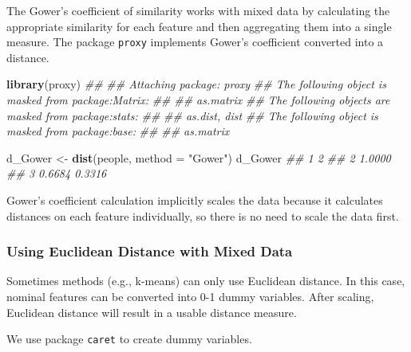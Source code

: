 \documentclass[
  notitlepage]{book}
\newenvironment{Shaded}{\begin{snugshade}}{\end{snugshade}}
\newcommand{\CommentTok}[1]{\textcolor[rgb]{0.56,0.35,0.01}{\textit{#1}}}
\newcommand{\DataTypeTok}[1]{\textcolor[rgb]{0.13,0.29,0.53}{#1}}
\newcommand{\KeywordTok}[1]{\textcolor[rgb]{0.13,0.29,0.53}{\textbf{#1}}}
\newcommand{\NormalTok}[1]{#1}
\newcommand{\StringTok}[1]{\textcolor[rgb]{0.31,0.60,0.02}{#1}}
\begin{document}
The Gower's coefficient of similarity works with mixed data by
calculating the appropriate similarity for each feature and then
aggregating them into a single measure. The package \texttt{proxy} implements
Gower's coefficient converted into a distance.

\begin{Shaded}
\begin{Highlighting}[]
\KeywordTok{library}\NormalTok{(proxy)}
\CommentTok{\#\# }
\CommentTok{\#\# Attaching package: \textquotesingle{}proxy\textquotesingle{}}
\CommentTok{\#\# The following object is masked from \textquotesingle{}package:Matrix\textquotesingle{}:}
\CommentTok{\#\# }
\CommentTok{\#\#     as.matrix}
\CommentTok{\#\# The following objects are masked from \textquotesingle{}package:stats\textquotesingle{}:}
\CommentTok{\#\# }
\CommentTok{\#\#     as.dist, dist}
\CommentTok{\#\# The following object is masked from \textquotesingle{}package:base\textquotesingle{}:}
\CommentTok{\#\# }
\CommentTok{\#\#     as.matrix}
\end{Highlighting}
\end{Shaded}

\begin{Shaded}
\begin{Highlighting}[]
\NormalTok{d\_Gower \textless{}{-}}\StringTok{ }\KeywordTok{dist}\NormalTok{(people, }\DataTypeTok{method =} \StringTok{"Gower"}\NormalTok{)}
\NormalTok{d\_Gower}
\CommentTok{\#\#        1      2}
\CommentTok{\#\# 2 1.0000       }
\CommentTok{\#\# 3 0.6684 0.3316}
\end{Highlighting}
\end{Shaded}

Gower's coefficient calculation implicitly scales the data because it
calculates distances on each feature individually, so there is no need
to scale the data first.

\hypertarget{using-euclidean-distance-with-mixed-data}{%
\subsubsection{Using Euclidean Distance with Mixed Data}\label{using-euclidean-distance-with-mixed-data}}

Sometimes methods (e.g., k-means) can only use Euclidean distance. In
this case, nominal features can be converted into 0-1 dummy variables.
After scaling, Euclidean distance will result in a usable distance
measure.

We use package \texttt{caret} to create dummy variables.
\end{document}
